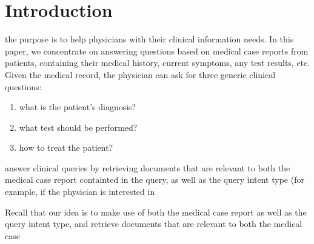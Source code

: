 \chapter{Introduction}
\cite{bringhurst1996ets}

the purpose is to help physicians with their clinical information needs. In this paper, we concentrate
on answering questions based on medical case reports from patients, containing their medical history, current symptoms, any test results, etc.
Given the medical record, the physician can ask for three generic clinical questions: 
\begin{enumerate}[label=\arabic*)]
 \item what is the patient's diagnosis?
 \item what test should be performed?
 \item how to treat the patient?
\end{enumerate}

answer clinical queries by retrieving documents that are relevant to both the medical case report
containted in the query, as well as the query intent type (for example, if the physician is interested in 

Recall that our idea is to make use of both the medical case report as well as the query intent type, and retrieve documents
that are relevant to both the medical case 



